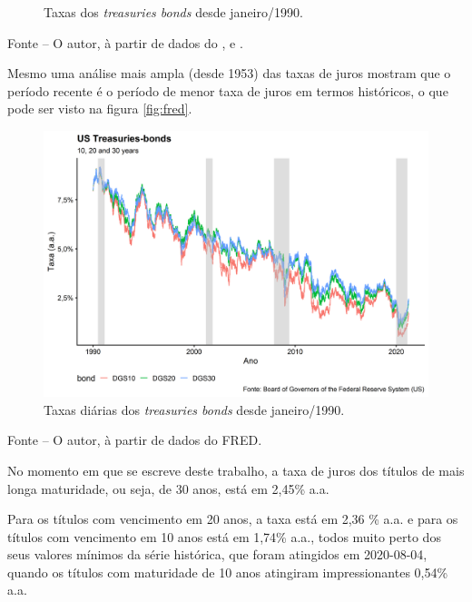 \documentclass[
	12pt,				%
	oneside,			%
	a4paper,			%
	chapter=TITLE,		%
	section=TITLE,		%
	english,			%
	brazil				%
	]{abntex2}
\newcommand{\bcenter}{\begin{center}}
\newcommand{\ecenter}{\end{center}}
\begin{document}
\begin{refsection}
\begin{figure}[H]
\caption{Taxas dos \emph{treasuries bonds} desde janeiro/1990.}\label{fig:yields}
\end{figure}
\bcenter

\small Fonte -- O autor, à partir de dados do \textcite{fredgs10}, \autocite*{fredgs20} e \autocite*{fredgs30}.
\ecenter

Mesmo uma análise mais ampla (desde 1953) das taxas de juros mostram que o
período recente é o período de menor taxa de juros em termos históricos, o que
pode ser visto na figura \ref{fig:fred}.
\begin{figure}[H]

{\centering \includegraphics[width=0.7\linewidth]{images/yields2-1} 

}

\caption{Taxas diárias dos \emph{treasuries bonds} desde janeiro/1990.}\label{fig:yields2}
\end{figure}
\bcenter

\small Fonte -- O autor, à partir de dados do \gls{FRED}.
\ecenter

No momento em que se escreve deste trabalho, a taxa de juros dos títulos de mais
longa maturidade, ou seja, de 30 anos, está em 2,45\% a.a.

Para os títulos com vencimento em 20 anos, a taxa está em 2,36
\% a.a. e para os títulos com vencimento em 10 anos está em 1,74\% a.a.,
todos muito perto dos seus valores mínimos da série histórica, que foram
atingidos em 2020-08-04, quando os títulos
com maturidade de 10 anos atingiram impressionantes 0,54\% a.a.


\end{refsection}
\end{document}
